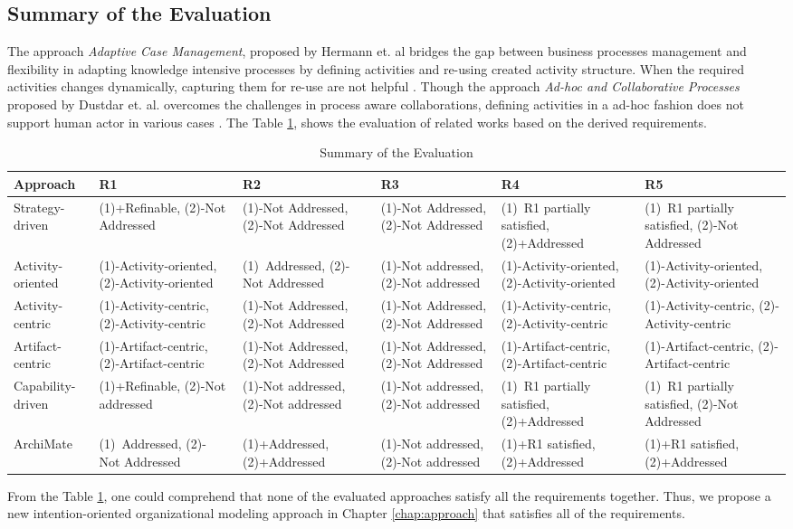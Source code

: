 \subsection {Summary of the Evaluation}
 The approach \textit{Adaptive Case Management}, proposed by Hermann et. al \cite{Herrmann2011} bridges the gap between business processes management and flexibility in adapting knowledge intensive processes by defining activities and re-using created activity structure. When the required activities changes dynamically, capturing them for re-use are not helpful \cite{Sungur2015}. Though the approach \textit{Ad-hoc and Collaborative Processes} proposed by Dustdar et. al. overcomes the challenges in process aware collaborations, defining activities in a ad-hoc fashion does not support human actor in various cases \cite{Sungur2015}. The Table \ref{tab:evaluationoftheapproach}, shows the evaluation of related works based on the derived requirements. 

\begin{table}[]
	\scriptsize 
	\centering
	\begin{tabular}{p{2cm}p{2.5cm}p{2.5cm}p{2.5cm}p{2.5cm}p{2.5cm}}
	\toprule
		Approach & R1               & R2               & R3         & R4       & R5        \\
	\midrule
	Strategy-driven & (1)+Refinable, (2)-Not Addressed  & (1)-Not Addressed, (2)-Not Addressed  & (1)-Not Addressed, (2)-Not Addressed  & (1)~R1 partially satisfied, (2)+Addressed  & (1)~R1 partially satisfied, (2)-Not Addressed \\
	Activity-oriented & (1)-Activity-oriented, (2)-Activity-oriented
	 &(1)~Addressed, (2)- Not Addressed  & (1)-Not addressed, (2)-Not addressed   &(1)-Activity-oriented, (2)-Activity-oriented  &(1)-Activity-oriented, (2)-Activity-oriented \\
	Activity-centric & (1)-Activity-centric, (2)-Activity-centric  & (1)-Not Addressed, (2)-Not Addressed  & (1)-Not Addressed, (2)-Not Addressed  &  (1)-Activity-centric, (2)-Activity-centric &  (1)-Activity-centric, (2)-Activity-centric \\
	Artifact-centric    & (1)-Artifact-centric, (2)-Artifact-centric  & (1)-Not Addressed, (2)-Not Addressed  & (1)-Not Addressed, (2)-Not Addressed  & (1)-Artifact-centric, (2)-Artifact-centric & (1)-Artifact-centric, (2)-Artifact-centric  \\ 
	Capability-driven   & (1)+Refinable, (2)-Not addressed & (1)-Not addressed, (2)-Not addressed   & (1)-Not addressed, (2)-Not addressed  & (1)~R1 partially satisfied, (2)+Addressed  & (1)~R1 partially satisfied, (2)-Not Addressed  \\
	ArchiMate  & (1)~Addressed, (2)- Not Addressed & (1)+Addressed, (2)+Addressed & (1)-Not addressed, (2)-Not addressed  & (1)+R1 satisfied, (2)+Addressed & (1)+R1 satisfied, (2)+Addressed\\
	\bottomrule   
	\end{tabular}
	\caption{Summary of the Evaluation}
	\label{tab:evaluationoftheapproach}  
\end{table}


From the Table \ref{tab:evaluationoftheapproach}, one could comprehend that none of the evaluated approaches satisfy all the requirements together. Thus, we propose a new intention-oriented organizational modeling approach in Chapter \ref{chap:approach} that satisfies all of the requirements. 
 


